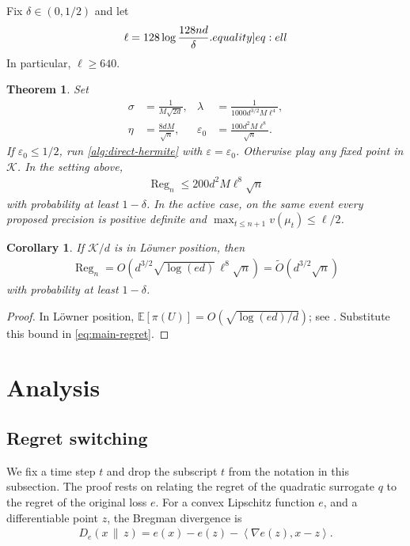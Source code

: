 \documentclass[11pt]{article}
\newtheorem{theorem}{Theorem}
\newtheorem{corollary}[corollary]{Corollary}
\newcommand{\eqlabel}[1]{\label[equality]{#1}}
\newcommand{\E}{\mathbb E}
\newcommand{\K}{\mathcal K}
\newcommand{\1}{\mathbf 1}
\newcommand{\eps}{\varepsilon}
\newcommand{\ip}[2]{\left\langle #1,#2\right\rangle}
\begin{document}
Fix $\delta\in(0,1/2)$ and let
\begin{align}
    \ell=128\log\frac{128nd}{\delta}.
    \eqlabel{eq:ell}
\end{align}
In particular, $\ell\geq640$.

\begin{theorem}
    \label{thm:main}
    Set
    \begin{align}
        \sigma  & =\frac1{M\sqrt{2d}},
                &
        \lambda & =\frac{1}{1000d^{3/2}M\ell^4},
        \label{eq:parameters-one}                 \\
        \eta    & =\frac{8dM}{\sqrt n},
                &
        \eps_0  & =\frac{100d^2M\ell^8}{\sqrt n}.
        \label{eq:parameters-two}
    \end{align}
    If $\eps_0\leq1/2$, run \cref{alg:direct-hermite} with $\eps=\eps_0$.
    Otherwise play any fixed point in $\K$.  In the setting above,
    \begin{align}
        \operatorname{Reg}_n
        \leq 200d^2M\ell^8\sqrt n
        \label{eq:main-regret}
    \end{align}
    with probability at least $1-\delta$. In the active case, on the same
    event every proposed precision is positive definite and
    $\max_{t\leq n+1}v(\mu_t)\leq\ell/2$.
\end{theorem}

\begin{corollary}
    \label{cor:loewner}
    If $\K/d$ is in L\"owner position, then
    \begin{align}
        \operatorname{Reg}_n
        =O\!\left(
        d^{3/2}\sqrt{\log(ed)}\,\ell^8\sqrt n
        \right)
        =\widetilde O(d^{3/2}\sqrt n)
    \end{align}
    with probability at least $1-\delta$.
\end{corollary}

\begin{proof}
    In L\"owner position,
    $\E[\pi(U)]=O(\sqrt{\log(ed)/d})$; see
    \citet[Table~10.1(a)]{lattimore2026bandit}.  Substitute this bound in
    \eqref{eq:main-regret}.
\end{proof}

\section{Analysis}
\label{sec:analysis}
\subsection{Regret switching}
We fix a time step $t$ and drop the subscript $t$ from the notation in this subsection.
The proof rests on relating the regret of the quadratic surrogate $q$ to the regret of the original loss $e$.
For a convex Lipschitz function $e$, and a differentiable point $z$, the Bregman divergence is
\begin{align}
    D_e(x\,\|\,z)
    =e(x)-e(z)-\ip{\nabla e(z)}{x-z}.
    \label{eq:bregman}
\end{align}
\end{document}
